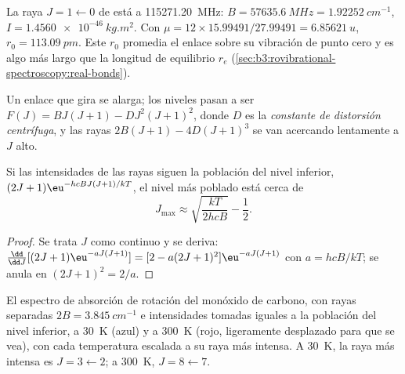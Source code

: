 \begin{example}\label{ex:b3:rovibrational-spectroscopy:co}
La raya $J = 1 \leftarrow 0$ de  está a \qty{115271.20}{MHz}:
$B = \qty{57635.6}{MHz} = \qty{1.92252}{cm^{-1}}$, $I = \qty{1.4560e-46}{kg.m^2}$.
Con $\mu = 12 \times 15.99491/27.99491 = \qty{6.85621}{u}$, $r_0 = \qty{113.09}{pm}$.
Este $r_0$ promedia el enlace sobre su vibración de punto cero y es algo más
largo que la longitud de equilibrio $r_e$ (\cref{sec:b3:rovibrational-spectroscopy:real-bonds}).
\end{example}

\begin{definition}\label{def:b3:rovibrational-spectroscopy:centrifugal}
Un enlace que gira se alarga; los niveles pasan a ser $F(J) = BJ(J+1) - DJ^2(J+1)^2$,
donde $D$ es la \emph{constante de distorsión centrífuga},
y las rayas $2B(J+1) - 4D(J+1)^3$ se van acercando lentamente a
$J$ alto.
\end{definition}

\begin{proposition}\label{prop:b3:rovibrational-spectroscopy:jmax}
Si las intensidades de las rayas siguen la población del nivel inferior, $(2J+1)
\eu^{-hcBJ(J+1)/kT}$, el nivel más poblado está cerca de
\[
J_{\max} \approx \sqrt{\frac{kT}{2hcB}} - \frac12.
\]
\end{proposition}

\begin{proof}
Se trata $J$ como continuo y se deriva: $\frac{\dd}{\dd J}[(2J+1)\eu^{-aJ(J+1)}]
= [2 - a(2J+1)^2]\eu^{-aJ(J+1)}$ con $a = hcB/kT$; se anula en $(2J + 1)^2 =
2/a$.
\end{proof}

\begin{omfigure}

{\small El espectro de absorción de rotación del monóxido de carbono, con rayas separadas
$2B = \qty{3.845}{cm^{-1}}$ e intensidades tomadas iguales a la población del
nivel inferior, a \qty{30}{K} (azul) y a \qty{300}{K} (rojo, ligeramente desplazado para
que se vea), con cada temperatura escalada a su raya más intensa. A \qty{30}{K}, la raya más intensa es
$J = 3 \leftarrow 2$; a \qty{300}{K}, $J = 8 \leftarrow 7$.}
\end{omfigure}

